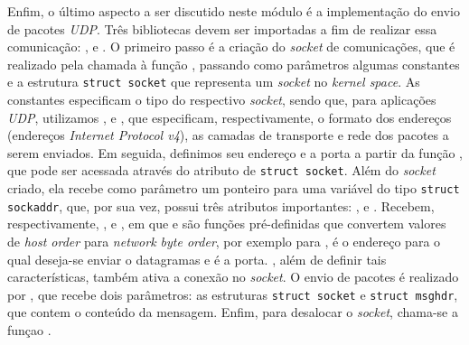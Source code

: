 Enfim, o último aspecto a ser discutido neste módulo é a implementação do envio
de pacotes \textit{UDP}. Três bibliotecas devem ser importadas a fim de realizar
essa comunicação: ,  e
. O primeiro passo é a criação do \textit{socket} de
comunicações, que é realizado pela chamada à função ,
passando como parâmetros algumas constantes e a estrutura \texttt{struct socket}
que representa um \textit{socket} no \textit{kernel space}. As constantes
especificam o tipo do respectivo \textit{socket}, sendo que, para aplicações
\textit{UDP}, utilizamos ,  e ,
que especificam, respectivamente, o formato dos endereços (endereços
\textit{Internet Protocol v4}), as camadas de transporte e rede dos pacotes a
serem enviados. Em seguida, definimos seu endereço e a porta a partir da função
, que pode ser acessada através do atributo  de
\texttt{struct socket}. Além do \textit{socket} criado, ela recebe como
parâmetro um ponteiro para uma variável do tipo \texttt{struct sockaddr}, que,
por sua vez, possui três atributos importantes: ,
 e . Recebem, respectivamente,
,  e , em que
 e  são funções pré-definidas que convertem valores
de \textit{host order} para \textit{network byte order}, por exemplo  para ,  é o
endereço para o qual deseja-se enviar o datagramas e  é a
porta. , além de definir tais características, também ativa a conexão no \textit{socket}. O envio de pacotes é
realizado por , que recebe dois parâmetros: as estruturas
\texttt{struct socket} e \texttt{struct msghdr}, que contem o conteúdo da
mensagem. Enfim, para desalocar o \textit{socket}, chama-se a funçao
.

% 
% 
%  

